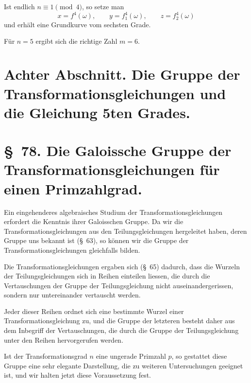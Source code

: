 \documentclass[11pt]{article}
\begin{document}
Ist endlich $n\equiv1\pmod4$, so setze man
\[
 x=f^4(\omega),\qquad y=f_1^4(\omega),\qquad z=f_2^4(\omega)
\]
und erhält eine Grundkurve vom sechsten Grade.

Für $n=5$ ergibt sich die richtige Zahl $m=6$.

\section*{Achter Abschnitt. Die Gruppe der Transformationsgleichungen und die Gleichung 5ten Grades.}

\section*{\S~78. Die Galoissche Gruppe der Transformationsgleichungen für einen Primzahlgrad.}

Ein eingehenderes algebraisches Studium der Transformationsgleichungen erfordert die Kenntnis ihrer Galoisschen Gruppe. Da wir die Transformationsgleichungen aus den Teilungsgleichungen hergeleitet haben, deren Gruppe uns bekannt ist (\S~63), so können wir die Gruppe der Transformationsgleichungen gleichfalls bilden.

Die Transformationsgleichungen ergaben sich (\S~65) dadurch, dass die Wurzeln der Teilungsgleichungen sich in Reihen einteilen liessen, die durch die Vertauschungen der Gruppe der Teilungsgleichung nicht auseinandergerissen, sondern nur untereinander vertauscht werden.

Jeder dieser Reihen ordnet sich eine bestimmte Wurzel einer Transformationsgleichung zu, und die Gruppe der letzteren besteht daher aus dem Inbegriff der Vertauschungen, die durch die Gruppe der Teilungsgleichung unter den Reihen hervorgerufen werden.

Ist der Transformationsgrad $n$ eine ungerade Primzahl $p$, so gestattet diese Gruppe eine sehr elegante Darstellung, die zu weiteren Untersuchungen geeignet ist, und wir halten jetzt diese Voraussetzung fest.
\end{document}
